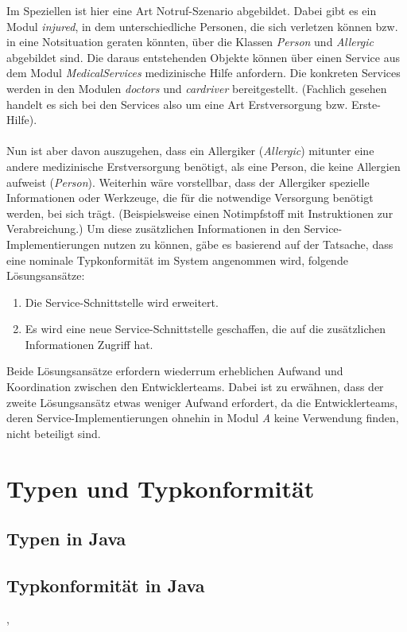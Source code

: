 \documentclass[11pt, 
ngerman,
doublespacing,
chapterinoneline, %
consistentlayout, %
]{scrartcl}
\begin{document}
Im Speziellen ist hier eine Art Notruf-Szenario abgebildet. Dabei gibt es ein Modul \emph{injured}, in dem unterschiedliche Personen, die sich verletzen können bzw. in eine Notsituation geraten könnten, über die Klassen \emph{Person} und \emph{Allergic} abgebildet sind. Die daraus entstehenden Objekte können über einen Service aus dem Modul \emph{MedicalServices} medizinische Hilfe anfordern. Die konkreten Services werden in den Modulen \emph{doctors} und \emph{cardriver} bereitgestellt. (Fachlich gesehen handelt es sich bei den Services also um eine Art Erstversorgung bzw. Erste-Hilfe).\\\\
Nun ist aber davon auszugehen, dass ein Allergiker (\emph{Allergic}) mitunter eine andere medizinische Erstversorgung benötigt, als eine Person, die keine Allergien aufweist (\emph{Person}). Weiterhin wäre vorstellbar, dass der Allergiker spezielle Informationen oder Werkzeuge, die für die notwendige Versorgung benötigt werden, bei sich trägt. (Beispielsweise einen Notimpfstoff mit Instruktionen zur Verabreichung.) Um diese zusätzlichen Informationen in den Service-Implementierungen nutzen zu können, gäbe es basierend auf der Tatsache, dass eine nominale Typkonformität im System angenommen wird, folgende Lösungsansätze:
\begin{enumerate}
\item Die Service-Schnittstelle wird erweitert.
\item Es wird eine neue Service-Schnittstelle geschaffen, die auf die zusätzlichen Informationen Zugriff hat.
\end{enumerate}
Beide Lösungsansätze erfordern wiederrum erheblichen Aufwand und Koordination zwischen den Entwicklerteams. Dabei ist zu erwähnen, dass der zweite Lösungsansätz etwas weniger Aufwand erfordert, da die Entwicklerteams, deren Service-Implementierungen ohnehin in Modul \emph{A} keine Verwendung finden, nicht beteiligt sind. 

\section{Typen und Typkonformität}
\cite{types}
\subsection{Typen in Java}
\subsection{Typkonformität in Java}
\cite{structconfjava}, \cite{compoundtypes}
\end{document}
